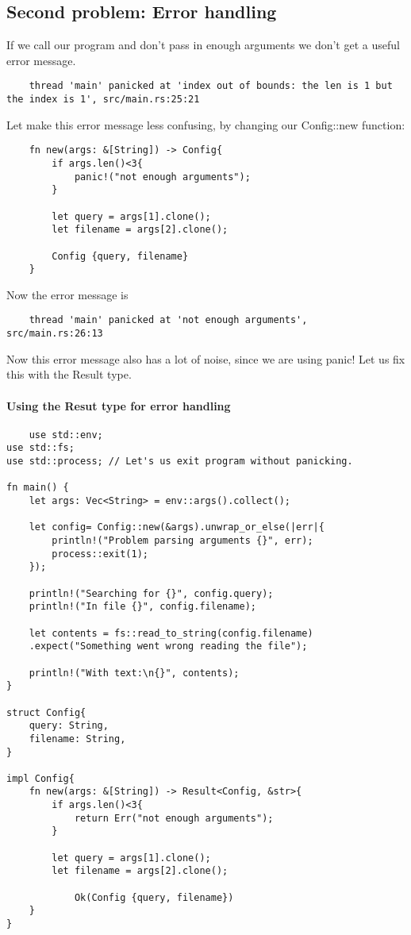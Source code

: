 \subsection{Second problem: Error handling}

If we call our program and don't pass in enough arguments we don't get a useful error message.\begin{lstlisting}
    thread 'main' panicked at 'index out of bounds: the len is 1 but the index is 1', src/main.rs:25:21
\end{lstlisting}

Let make this error message less confusing, by changing our Config::new function:
\begin{lstlisting}
    fn new(args: &[String]) -> Config{
        if args.len()<3{
            panic!("not enough arguments");
        }

        let query = args[1].clone();
        let filename = args[2].clone();
        
        Config {query, filename}
    }     
\end{lstlisting}

Now the error message is\begin{lstlisting}
    thread 'main' panicked at 'not enough arguments', src/main.rs:26:13
\end{lstlisting}

Now this error message also has a lot of noise, since we are using panic! Let us fix this with the Result type.

\paragraph*{Using the Resut type for error handling}\begin{lstlisting}
    use std::env;
use std::fs;
use std::process; // Let's us exit program without panicking.

fn main() {
    let args: Vec<String> = env::args().collect(); 
    
    let config= Config::new(&args).unwrap_or_else(|err|{
        println!("Problem parsing arguments {}", err);
        process::exit(1);
    });

    println!("Searching for {}", config.query);
    println!("In file {}", config.filename);

    let contents = fs::read_to_string(config.filename)
    .expect("Something went wrong reading the file");

    println!("With text:\n{}", contents);
}

struct Config{
    query: String,
    filename: String,
}

impl Config{
    fn new(args: &[String]) -> Result<Config, &str>{
        if args.len()<3{
            return Err("not enough arguments");
        }

        let query = args[1].clone();
        let filename = args[2].clone();
        
            Ok(Config {query, filename})
    } 
}
\end{lstlisting}

